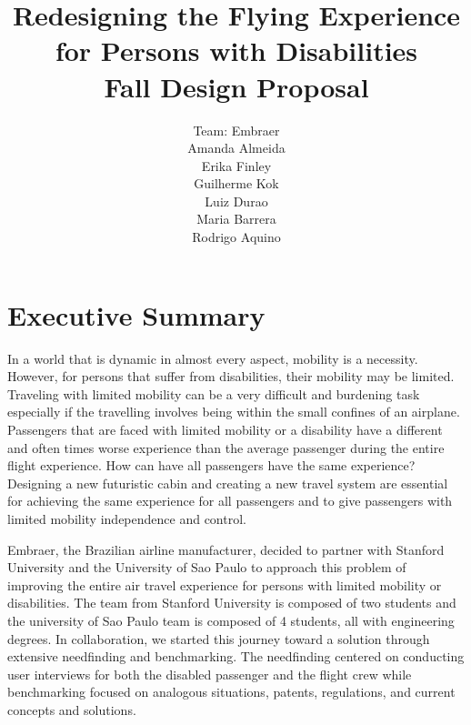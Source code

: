 \documentclass[a4paper, 12pt,conference]{new_cit_thesis}
\title{Redesigning the Flying Experience for Persons with Disabilities \\
	Fall Design Proposal}
\author{Team: Embraer \\
	   Amanda Almeida \\
	   Erika Finley \\
	  Guilherme Kok \\
	  Luiz Durao \\
	  Maria Barrera \\
	  Rodrigo Aquino}
\begin{document}
\tableofcontents

\newpage

\chapter{Executive Summary}
In a world that is dynamic in almost every aspect, mobility is a necessity.  However, for persons that suffer from disabilities, their mobility may be limited.  Traveling with limited mobility can be a very difficult and burdening task especially if the travelling involves being within the small confines of an airplane.  Passengers that are faced with limited mobility or a disability have a different and often times worse experience than the average passenger during the entire flight experience.  How can have all passengers have the same experience? Designing a new futuristic cabin and creating a new travel system are essential for achieving the same experience for all passengers and to give passengers with limited mobility independence and control.

Embraer, the Brazilian airline manufacturer, decided to partner with Stanford University and the University of Sao Paulo to approach this problem of improving the entire air travel experience for persons with limited mobility or disabilities. The team from Stanford University is composed of two students and the university of Sao Paulo team is composed of 4 students, all with engineering degrees.  In collaboration, we started this journey toward a solution through extensive needfinding and benchmarking.  The needfinding centered on conducting user interviews for both the disabled passenger and the flight crew while benchmarking focused on analogous situations, patents, regulations, and current concepts and solutions.
\end{document}
